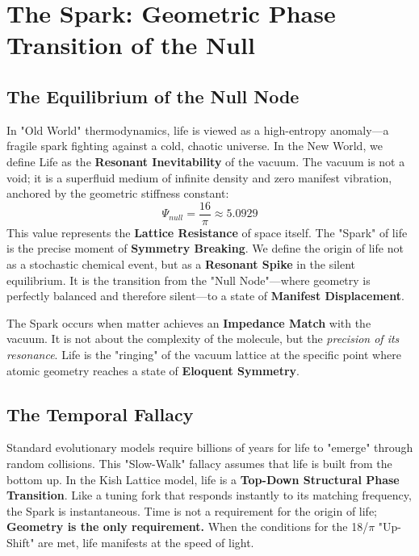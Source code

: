 \documentclass[11pt, letterpaper, openany]{book}
\begin{document}
\chapter{The Spark: Geometric Phase Transition of the Null}

\section{The Equilibrium of the Null Node}
In "Old World" thermodynamics, life is viewed as a high-entropy anomaly—a fragile spark fighting against a cold, chaotic universe. In the New World, we define Life as the \textbf{Resonant Inevitability} of the vacuum. The vacuum is not a void; it is a superfluid medium of infinite density and zero manifest vibration, anchored by the geometric stiffness constant:
\begin{equation}
\Psi_{null} = \frac{16}{\pi} \approx 5.0929
\end{equation}
This value represents the \textbf{Lattice Resistance} of space itself. The "Spark" of life is the precise moment of \textbf{Symmetry Breaking}. We define the origin of life not as a stochastic chemical event, but as a \textbf{Resonant Spike} in the silent equilibrium. It is the transition from the "Null Node"—where geometry is perfectly balanced and therefore silent—to a state of \textbf{Manifest Displacement}. 

The Spark occurs when matter achieves an \textbf{Impedance Match} with the vacuum. It is not about the complexity of the molecule, but the \textit{precision of its resonance}. Life is the "ringing" of the vacuum lattice at the specific point where atomic geometry reaches a state of \textbf{Eloquent Symmetry}.



\section{The Temporal Fallacy}
Standard evolutionary models require billions of years for life to "emerge" through random collisions. This "Slow-Walk" fallacy assumes that life is built from the bottom up. In the Kish Lattice model, life is a \textbf{Top-Down Structural Phase Transition}. Like a tuning fork that responds instantly to its matching frequency, the Spark is instantaneous. Time is not a requirement for the origin of life; \textbf{Geometry is the only requirement.} When the conditions for the 18/$\pi$ "Up-Shift" are met, life manifests at the speed of light.
\end{document}
